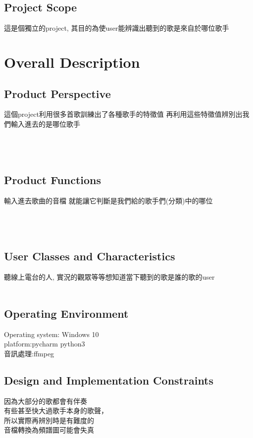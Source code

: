 \documentclass{article}
\begin{document}
\begin{CJK}{UTF8}{bkai}
\subsection{Project Scope\\}
這是個獨立的project, 
其目的為使user能辨識出聽到的歌是來自於哪位歌手

\newpage


\section{\huge\bf \color{blue}  Overall Description\\}

\subsection{\Large Product Perspective\\}
 \large 這個project利用很多首歌訓練出了各種歌手的特徵值 再利用這些特徵值辨別出我們輸入進去的是哪位歌手\\\\\\\\
\subsection{\Large Product Functions}
\large 輸入進去歌曲的音檔 就能讓它判斷是我們給的歌手們(分類)中的哪位\\\\\\\\

\subsection{\Large User Classes and Characteristics\\}
  \Large 聽線上電台的人, 實況的觀眾等等想知道當下聽到的歌是誰的歌的user\\\\
\newpage
\subsection{\Large Operating Environment \\}
 \Large Operating system: Windows 10\\
platform:pycharm python3\\
音訊處理:ffmpeg

\subsection{\Large Design and Implementation Constraints\\}
   \Large 因為大部分的歌都會有伴奏 \\
有些甚至快大過歌手本身的歌聲，\\
所以實際再辨別時是有難度的\\
音檔轉換為頻譜圖可能會失真

\end{CJK}
\end{document}

